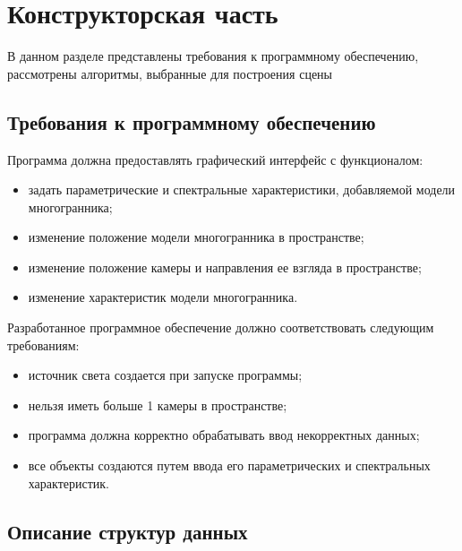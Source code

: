 \section{Конструкторская часть}
В данном разделе представлены требования к программному обеспечению, рассмотрены алгоритмы, выбранные для построения сцены

\subsection{Требования к программному обеспечению}

Программа должна предоставлять графический интерфейс с функционалом:
\begin{itemize}
	\item задать параметрические и спектральные характеристики, добавляемой модели многогранника;
	\item изменение положение модели многогранника в пространстве;
	\item изменение положение камеры и направления ее взгляда в пространстве;
	\item изменение характеристик модели многогранника.
\end{itemize}

Разработанное программное обеспечение должно соответствовать следующим требованиям:
\begin{itemize}
	\item источник света создается при запуске программы;
	\item нельзя иметь больше 1 камеры в пространстве;
	\item программа должна корректно обрабатывать ввод некорректных данных;
	\item все объекты создаются путем ввода его параметрических и спектральных характеристик.
\end{itemize}

\subsection{Описание структур данных}

